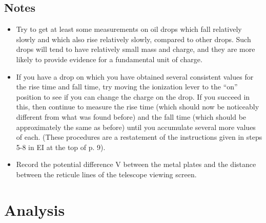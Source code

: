 \documentclass{article}
\begin{document}
\subsection{Notes}
\label{secnotes}

\begin{itemize}
\item Try to get at least some measurements on oil drops which fall
relatively slowly and which also rise relatively slowly, compared to
other drops.  Such drops will tend to have relatively small mass and
charge, and they are more likely to provide evidence for a fundamental
unit of charge.


\item If you have a drop on which you have obtained several consistent
values for the rise time and fall time, try moving the ionization lever
to the ``on'' position to see if you can
change the charge on the drop.  If you succeed in this, then continue
to measure the rise time (which should now be noticeably different from
what was found before) and the fall time (which should be approximately
the same as before) until you accumulate several more values of each.
 (These procedures are a restatement of the instructions given in
steps 5-8 in EI at the top of p. 9).

\item Record the potential difference V between the metal plates and the
distance between the reticule lines of the telescope viewing screen.
\end{itemize}

\section{Analysis}
\end{document}
